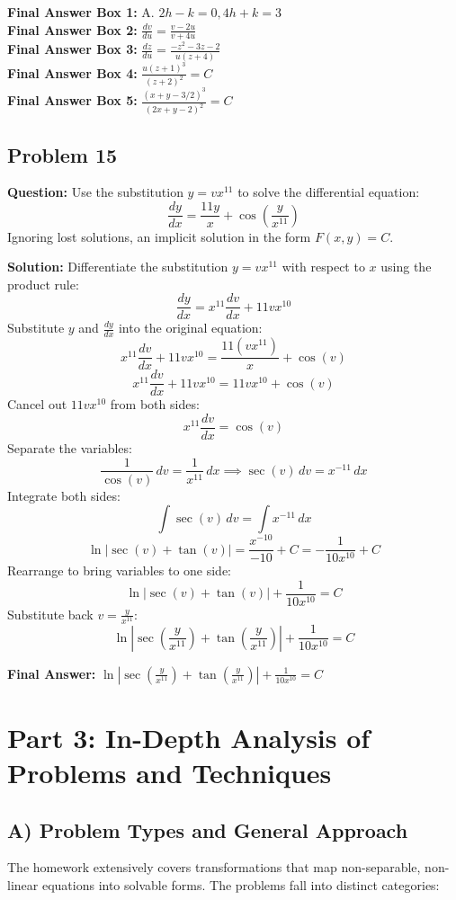 \documentclass[11pt]{article}
\begin{document}
\textbf{Final Answer Box 1:} A. $2h-k=0, 4h+k=3$ \\
\textbf{Final Answer Box 2:} $\frac{dv}{du} = \frac{v-2u}{v+4u}$ \\
\textbf{Final Answer Box 3:} $\frac{dz}{du} = \frac{-z^2-3z-2}{u(z+4)}$ \\
\textbf{Final Answer Box 4:} $\frac{u(z+1)^3}{(z+2)^2} = C$ \\
\textbf{Final Answer Box 5:} $\frac{(x+y-3/2)^3}{(2x+y-2)^2} = C$

\vspace{0.5cm}
\subsection*{Problem 15}
\textbf{Question:} Use the substitution $y = v x^{11}$ to solve the differential equation:
\[ \frac{dy}{dx} = \frac{11y}{x} + \cos\left(\frac{y}{x^{11}}\right) \]
Ignoring lost solutions, an implicit solution in the form $F(x,y) = C$.

\textbf{Solution:}
Differentiate the substitution $y = v x^{11}$ with respect to $x$ using the product rule:
\[ \frac{dy}{dx} = x^{11}\frac{dv}{dx} + 11vx^{10} \]
Substitute $y$ and $\frac{dy}{dx}$ into the original equation:
\[ x^{11}\frac{dv}{dx} + 11vx^{10} = \frac{11(vx^{11})}{x} + \cos(v) \]
\[ x^{11}\frac{dv}{dx} + 11vx^{10} = 11vx^{10} + \cos(v) \]
Cancel out $11vx^{10}$ from both sides:
\[ x^{11}\frac{dv}{dx} = \cos(v) \]
Separate the variables:
\[ \frac{1}{\cos(v)} \, dv = \frac{1}{x^{11}} \, dx \implies \sec(v) \, dv = x^{-11} \, dx \]
Integrate both sides:
\[ \int \sec(v) \, dv = \int x^{-11} \, dx \]
\[ \ln|\sec(v) + \tan(v)| = \frac{x^{-10}}{-10} + C = -\frac{1}{10x^{10}} + C \]
Rearrange to bring variables to one side:
\[ \ln|\sec(v) + \tan(v)| + \frac{1}{10x^{10}} = C \]
Substitute back $v = \frac{y}{x^{11}}$:
\[ \ln\left|\sec\left(\frac{y}{x^{11}}\right) + \tan\left(\frac{y}{x^{11}}\right)\right| + \frac{1}{10x^{10}} = C \]

\textbf{Final Answer:} $\ln\left|\sec\left(\frac{y}{x^{11}}\right) + \tan\left(\frac{y}{x^{11}}\right)\right| + \frac{1}{10x^{10}} = C$

\newpage
\section{Part 3: In-Depth Analysis of Problems and Techniques}

\subsection{A) Problem Types and General Approach}
The homework extensively covers transformations that map non-separable, non-linear equations into solvable forms. The problems fall into distinct categories:
\end{document}
